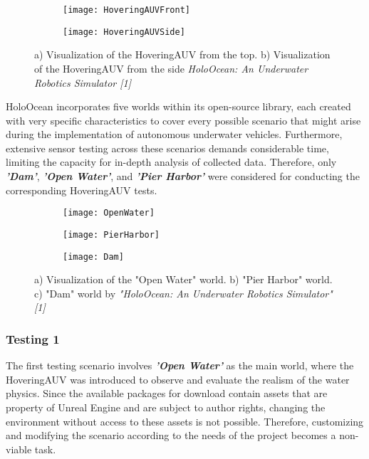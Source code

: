 \documentclass[]{article}
\begin{document}
	\begin{figure}[h]
		\begin{subfigure}{.5\textwidth}
			\centering
			\texttt{[image: HoveringAUVFront]}
			\caption{}
		\end{subfigure}
		\begin{subfigure}{.5\textwidth}
				\centering
			\texttt{[image: HoveringAUVSide]}
			\caption{}
		\end{subfigure}
		\caption{a) Visualization of the HoveringAUV from the top. b) Visualization of the HoveringAUV from the side \textit{HoloOcean: An Underwater Robotics Simulator [1]}}
	\end{figure}
	
	HoloOcean incorporates five worlds within its open-source library, each created with very specific characteristics to cover every possible scenario that might arise during the implementation of autonomous underwater vehicles. Furthermore, extensive sensor testing across these scenarios demands considerable time, limiting the capacity for in-depth analysis of collected data. Therefore, only \textbf{\textit{'Dam'}}, \textbf{\textit{'Open Water'}}, and \textbf{\textit{'Pier Harbor'}} were considered for conducting the corresponding HoveringAUV tests.
	
	\begin{figure}[H]
		\begin{subfigure}{.33\textwidth}
			\centering
			\texttt{[image: OpenWater]}
			\caption{}
		\end{subfigure}
		\begin{subfigure}{.33\textwidth}
			\centering
			\texttt{[image: PierHarbor]}
			\caption{}
		\end{subfigure}
		\begin{subfigure}{.33\textwidth}
				\centering
			\texttt{[image: Dam]}
			\caption{}
		\end{subfigure}
		\caption{a) Visualization of the "Open Water" world. b) "Pier Harbor" world. c) "Dam" world by \textit{"HoloOcean: An Underwater Robotics Simulator" [1]}}
	\end{figure}


	\subsubsection{Testing 1}
	
	The first testing scenario involves \textit{\textbf{'Open Water'}} as the main world, where the HoveringAUV was introduced to observe and evaluate the realism of the water physics. Since the available packages for download contain assets that are property of Unreal Engine and are subject to author rights, changing the environment without access to these assets is not possible. Therefore, customizing and modifying the scenario according to the needs of the project becomes a non-viable task.
	
\end{document}
